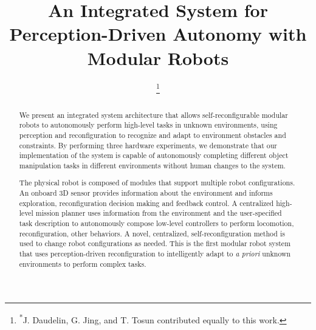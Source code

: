 \documentclass[conference]{IEEEtran}
\begin{document}
\title{An Integrated System for Perception-Driven Autonomy with Modular Robots}


\author{
%
\and
{}
%
\and
{}
%
\and
{}
%
\and
{}
%
\and
{}
%
\thanks{\textsuperscript{*}J. Daudelin, G. Jing, and T. Tosun contributed equally to this work.}
} 

\maketitle

\begin{abstract}

We present an integrated system architecture that allows self-reconfigurable modular robots to autonomously perform high-level tasks in unknown environments, using perception and reconfiguration to recognize and adapt to environment obstacles and constraints.  By performing three hardware experiments, we demonstrate that our implementation of the system is capable of autonomously completing different object manipulation tasks in different environments without human changes to the system.

The physical robot is composed of modules that support multiple robot configurations. An onboard 3D sensor provides information about the environment and informs exploration, reconfiguration decision making and feedback control.  A centralized high-level mission planner uses information from the environment and the user-specified task description to autonomously compose low-level controllers to perform locomotion, reconfiguration, other behaviors. A novel, centralized, self-reconfiguration method is used to change robot configurations as needed. This is the first modular robot system that uses perception-driven reconfiguration to intelligently adapt to \textit{a priori} unknown environments to perform complex tasks.

\end{abstract}
\end{document}
